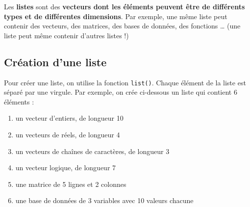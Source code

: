 \documentclass[
]{book}
\providecommand{\tightlist}{%
  \setlength{\itemsep}{0pt}\setlength{\parskip}{0pt}}
\begin{document}
Les \textbf{listes} sont des \textbf{vecteurs dont les éléments peuvent être de différents types et de différentes dimensions}. Par exemple, une même liste peut contenir des vecteurs, des matrices, des bases de données, des fonctions \ldots{} (une liste peut même contenir d'autres listes !)

\subsection{Création d'une liste}\label{cruxe9ation-dune-liste}

Pour créer une liste, on utilise la fonction \texttt{list()}. Chaque élément de la liste est séparé par une virgule. Par exemple, on crée ci-dessous un liste qui contient 6 éléments :

\begin{enumerate}
\def\labelenumi{\arabic{enumi})}
\tightlist
\item
  un vecteur d'entiers, de longueur 10
\item
  un vecteurs de réels, de longueur 4
\item
  un vecteurs de chaînes de caractères, de longueur 3
\item
  un vecteur logique, de longueur 7
\item
  une matrice de 5 lignes et 2 colonnes
\item
  une base de données de 3 variables avec 10 valeurs chacune
\end{enumerate}
\end{document}
